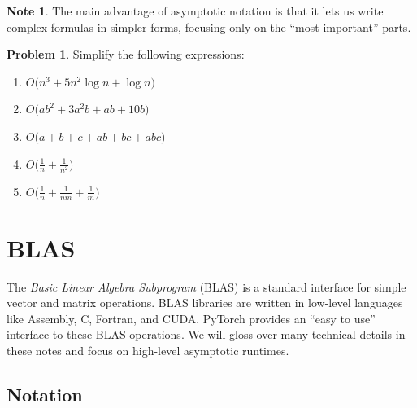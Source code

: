 \documentclass[10pt]{article}
\theoremstyle{definition}
\newtheorem{problem}{Problem}
\newtheorem{note}{Note}
\begin{document}
\newpage
\begin{note}
The main advantage of asymptotic notation is that it lets us write complex formulas in simpler forms,
focusing only on the ``most important'' parts.
\end{note}
\begin{problem}
    Simplify the following expressions:

\begin{enumerate}
    \item $O\bigg(n^3 + 5n^2\log n + \log n \bigg)$
    \vspace{1.5in}
\item $O\bigg(ab^2 + 3a^2b + ab + 10b\bigg)$
    \vspace{1.5in}
\item $O\bigg(a + b + c + ab + bc + abc\bigg)$
    \vspace{1.5in}
\item $O\bigg(\frac 1 n + \frac 1 {n^2}\bigg)$
    \vspace{1.5in}
\item $O\bigg(\frac 1 n + \frac 1 {nm} + \frac 1 m \bigg)$
    \vspace{1.5in}
\end{enumerate}
\end{problem}


\newpage
\section{BLAS}

The \emph{Basic Linear Algebra Subprogram} (BLAS) is a standard interface for simple vector and matrix operations.
BLAS libraries are written in low-level languages like Assembly, C, Fortran, and CUDA.
PyTorch provides an ``easy to use'' interface to these BLAS operations.
We will gloss over many technical details in these notes and focus on high-level asymptotic runtimes.

\subsection{Notation}
\end{document}
